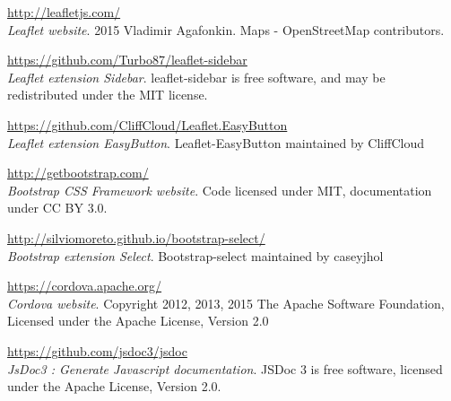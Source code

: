 \begin{thebibliography}{ABC}

    \url{http://leafletjs.com/}\\
    \emph{Leaflet website}. 
    2015 Vladimir Agafonkin. Maps - OpenStreetMap contributors.

    \url{https://github.com/Turbo87/leaflet-sidebar}\\
    \emph{Leaflet extension Sidebar}. 
    leaflet-sidebar is free software, and may be redistributed under the MIT license.

    \url{https://github.com/CliffCloud/Leaflet.EasyButton}\\
    \emph{Leaflet extension EasyButton}. 
    Leaflet-EasyButton maintained by CliffCloud

    \url{http://getbootstrap.com/}\\
    \emph{Bootstrap CSS Framework website}.
    Code licensed under MIT, documentation under CC BY 3.0. 

    \url{http://silviomoreto.github.io/bootstrap-select/}\\
    \emph{Bootstrap extension Select}.
    Bootstrap-select maintained by caseyjhol 

    \url{https://cordova.apache.org/}\\
    \emph{Cordova website}.
    Copyright 2012, 2013, 2015 The Apache Software Foundation, Licensed under the Apache License, Version 2.0 

    \url{https://github.com/jsdoc3/jsdoc}\\
    \emph{JsDoc3 : Generate Javascript documentation}.
    JSDoc 3 is free software, licensed under the Apache License, Version 2.0. 

\end{thebibliography}